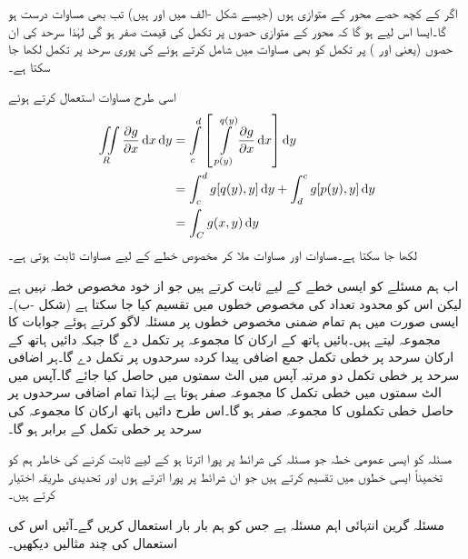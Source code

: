 اگر  کے کچھ حصے محور  کے متوازی ہوں (جیسے شکل -الف میں  اور  ہیں) تب بھی  مساوات  درست ہو گا۔ایسا اس لیے ہو گا کہ محور  کے متوازی حصوں پر تکمل کی قیمت صفر ہو گی لہٰذا سرحد کی ان حصوں (یعنی  اور   ) پر تکمل  کو بھی مساوات  میں شامل کرتے ہوئے  کی پوری سرحد پر تکمل لکھا جا سکتا ہے۔

اسی طرح مساوات  استعمال کرتے ہوئے
\begin{gather}
\begin{aligned}\label{مساوات_خطی_تکمل_مسئلہ_گرین_ثبوت_ت}
\iint\limits_R \frac{\partial g}{\partial x}\dif x\dif y&=\int\limits_c^d \left[\,\,\int\limits_{p(y)}^{q(y)}\frac{\partial g}{\partial x}\dif x\right]\dif y\\
&=\int_c^d g[q(y),y]\dif y+\int_d^c g[p(y),y]\dif y\\
&=\int_C g(x,y)\dif y
\end{aligned}
\end{gather}
لکھا جا سکتا ہے۔مساوات  اور مساوات   ملا کر مخصوص خطے کے لیے مساوات  ثابت ہوتی ہے۔

اب ہم مسئلے کو ایسی خطے کے لیے ثابت کرتے ہیں جو از خود مخصوص خطہ نہیں ہے لیکن اس کو محدود تعداد کی مخصوص خطوں میں تقسیم کیا جا سکتا ہے (شکل -ب)۔ایسی صورت میں ہم تمام ضمنی مخصوص خطوں پر مسئلہ لاگو کرتے ہوئے جوابات کا مجموعہ لیتے ہیں۔بائیں ہاتھ کے ارکان کا مجموعہ   پر تکمل دے گا جبکہ دائیں ہاتھ کے ارکان سرحد  پر خطی تکمل جمع اضافی پیدا کردہ سرحدوں پر تکمل دے گا۔ہر اضافی سرحد پر خطی تکمل دو مرتبہ آپس میں الٹ سمتوں میں حاصل کیا جائے گا۔آپس میں الٹ سمتوں میں خطی تکمل کا مجموعہ صفر ہوتا ہے لہٰذا تمام اضافی سرحدوں پر حاصل خطی تکملوں کا مجموعہ صفر ہو گا۔اس طرح دائیں ہاتھ ارکان کا مجموعہ  کی سرحد  پر خطی تکمل کے برابر ہو گا۔ 

مسئلہ کو ایسی عمومی خطہ  جو مسئلہ کی شرائط پر پورا اترتا ہو کے  لیے ثابت کرنے کی خاطر ہم  کو تخمیناً ایسی خطوں میں تقسیم کرتے ہیں جو ان شرائط پر پورا اترتے ہوں اور تحدیدی طریقہ اختیار کرتے ہیں۔ 

مسئلہ گرین انتہائی اہم مسئلہ ہے جس کو ہم بار بار استعمال کریں گے۔آئیں اس کی استعمال کی چند مثالیں دیکھیں۔

